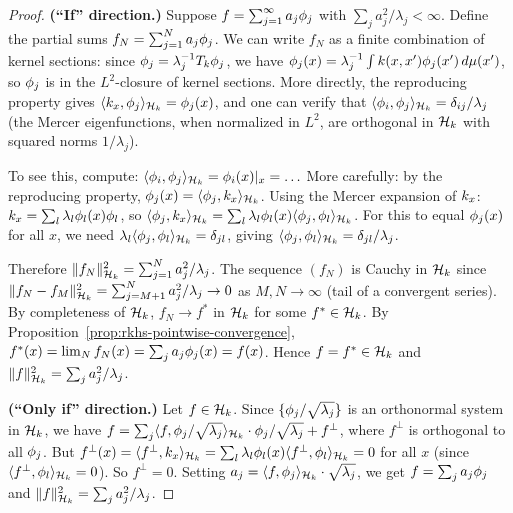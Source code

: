 \documentclass[11pt,a4paper]{article}
\begin{document}
\begin{proof}
\textbf{(``If'' direction.)} Suppose $f = \sum_{j=1}^\infty
a_j \phi_j$ with $\sum_j a_j^2 / \lambda_j < \infty$.
Define the partial sums $f_N = \sum_{j=1}^N a_j \phi_j$.
We can write $f_N$ as a finite combination of kernel sections:
since $\phi_j = \lambda_j^{-1} T_k \phi_j$, we
have $\phi_j(x) = \lambda_j^{-1} \int k(x, x')
\phi_j(x') \, d\mu(x')$, so $\phi_j$ is in the
$L^2$-closure of kernel sections. More directly, the reproducing
property gives $\langle k_x, \phi_j \rangle_{\mathcal{H}_k} =
\phi_j(x)$, and one can verify that
$\langle \phi_i, \phi_j \rangle_{\mathcal{H}_k} =
\delta_{ij} / \lambda_j$ (the Mercer eigenfunctions, when
normalized in $L^2$, are orthogonal in $\mathcal{H}_k$ with squared
norms $1/\lambda_j$).

To see this, compute:
$\langle \phi_i, \phi_j \rangle_{\mathcal{H}_k}
= \phi_i(x)|_{x} = \ldots$ More carefully: by the reproducing
property, $\phi_j(x) = \langle \phi_j, k_x
\rangle_{\mathcal{H}_k}$. Using the Mercer expansion of $k_x$:
$k_x = \sum_l \lambda_l \phi_l(x) \phi_l$, so
$\langle \phi_j, k_x \rangle_{\mathcal{H}_k} = \sum_l
\lambda_l \phi_l(x) \langle \phi_j, \phi_l
\rangle_{\mathcal{H}_k}$. For this to equal $\phi_j(x)$ for all $x$,
we need $\lambda_l \langle \phi_j, \phi_l \rangle_{\mathcal{H}_k}
= \delta_{jl}$, giving $\langle \phi_j, \phi_l
\rangle_{\mathcal{H}_k} = \delta_{jl} / \lambda_j$.

Therefore $\|f_N\|_{\mathcal{H}_k}^2 = \sum_{j=1}^N a_j^2 / \lambda_j$.
The sequence $(f_N)$ is Cauchy in $\mathcal{H}_k$ since
$\|f_N - f_M\|_{\mathcal{H}_k}^2 = \sum_{j=M+1}^N a_j^2 / \lambda_j
\to 0$ as $M, N \to \infty$ (tail of a convergent series).
By completeness of $\mathcal{H}_k$, $f_N \to f^*$ in $\mathcal{H}_k$ for some
$f^* \in \mathcal{H}_k$. By Proposition~\ref{prop:rkhs-pointwise-convergence},
$f^*(x) = \lim_N f_N(x) = \sum_j a_j \phi_j(x) = f(x)$.
Hence $f = f^* \in \mathcal{H}_k$ and $\|f\|_{\mathcal{H}_k}^2 = \sum_j a_j^2 /
\lambda_j$.

\textbf{(``Only if'' direction.)} Let $f \in \mathcal{H}_k$. Since
$\{\phi_j / \sqrt{\lambda_j}\}$ is an orthonormal system in
$\mathcal{H}_k$, we have $f = \sum_j \langle f, \phi_j /
\sqrt{\lambda_j} \rangle_{\mathcal{H}_k} \cdot \phi_j /
\sqrt{\lambda_j} + f^\perp$, where $f^\perp$ is orthogonal to
all $\phi_j$. But $f^\perp(x) = \langle f^\perp,
k_x \rangle_{\mathcal{H}_k} = \sum_l \lambda_l \phi_l(x)
\langle f^\perp, \phi_l \rangle_{\mathcal{H}_k} = 0$ for all $x$
(since $\langle f^\perp, \phi_l \rangle_{\mathcal{H}_k} = 0$).
So $f^\perp = 0$. Setting $a_j = \langle f, \phi_j
\rangle_{\mathcal{H}_k} \cdot \sqrt{\lambda_j}$, we get
$f = \sum_j a_j \phi_j$ and $\|f\|_{\mathcal{H}_k}^2 = \sum_j
a_j^2 / \lambda_j$.
\end{proof}
\end{document}

